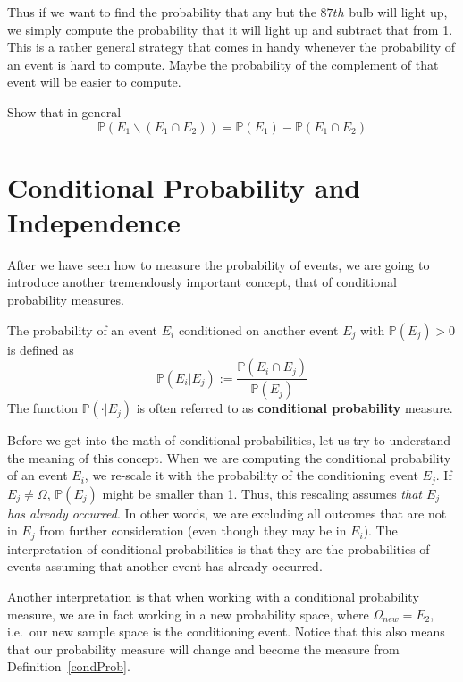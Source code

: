 \documentclass[a4paper,11pt,leqno]{report}
\begin{document}
Thus if we want to find the probability that any but the $ 87th $ bulb will light up, we simply compute
the probability that it will light up and subtract that from 1. This is a rather general strategy that
comes in handy whenever the probability of an event is hard to compute. Maybe the probability of the
complement of that event will be easier to compute.

\begin{Exercise}
Show that in general $$ \mathbb{P}(E_{1}\backslash (E_{1}\cap E_{2})) 
= \mathbb{P}(E_{1}) - \mathbb{P}(E_{1}\cap E_{2}) $$
\end{Exercise}

\section{Conditional Probability and Independence}
After we have seen how to measure the probability of events, we are going to introduce another
tremendously important concept, that of conditional probability measures.

\begin{Definition}{}
The probability of an event $ E_{i} $ conditioned on another event $ E_{j} $ with $\mathbb{P}(E_j) > 0$ is defined as
$$ \mathbb{P}(E_{i}|E_{j}) := \dfrac{\mathbb{P}(E_{i} \cap E_{j})}{\mathbb{P}(E_{j})} $$
The function $ \mathbb{P}(\cdot|E_{j}) $ is often referred to as \textbf{conditional probability} measure.
\label{condProb}
\end{Definition}

Before we get into the math of conditional probabilities, let us try to understand the meaning of this concept. When we are computing the conditional probability of an event $ E_{i} $, we re-scale it with the 
probability of the conditioning event $ E_{j} $. If $ E_{j} \not = \Omega $, $ \mathbb{P}(E_{j}) $
might be smaller than 1. Thus, this rescaling assumes \textit{that $ E_{j} $ has already occurred}. In other
words, we are excluding all outcomes that are not in $ E_{j} $ from further consideration (even though they
may be in $ E_{i} $). The interpretation of conditional probabilities is that they are the probabilities
of events assuming that another event has already occurred.

Another interpretation is that when working with a conditional probability measure, we are in fact working
in a new probability space, where $ \Omega_{new} = E_{2} $, i.e.\ our new sample space is the conditioning event.
Notice that this also means that our probability measure will change and become the
measure from Definition~\ref{condProb}.
\end{document}
